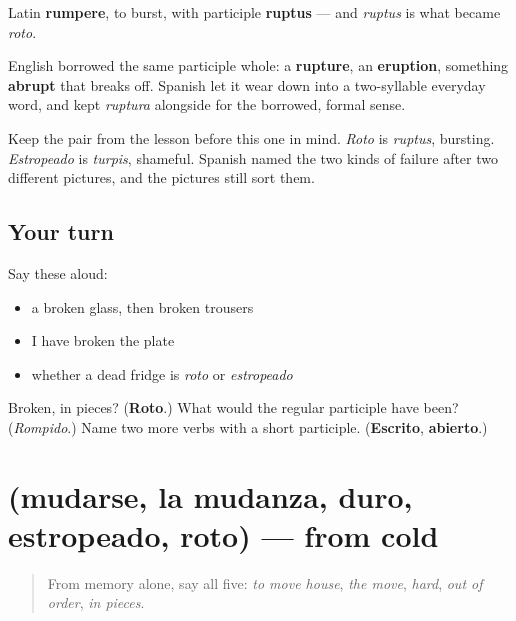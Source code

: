 \begin{cousinweb}
Latin \textbf{rumpere}, to burst, with participle \textbf{ruptus} — and \emph{ruptus} is what became \emph{roto}.

English borrowed the same participle whole: a \textbf{rupture}, an \textbf{eruption}, something \textbf{abrupt} that breaks off. Spanish let it wear down into a two-syllable everyday word, and kept \emph{ruptura} alongside for the borrowed, formal sense.

Keep the pair from the lesson before this one in mind. \emph{Roto} is \emph{ruptus}, bursting. \emph{Estropeado} is \emph{turpis}, shameful. Spanish named the two kinds of failure after two different pictures, and the pictures still sort them.
\end{cousinweb}

\subsection*{Your turn}
Say these aloud:

\begin{itemize}
\raggedright
  \item a broken glass, then broken trousers
  \item I have broken the plate
  \item whether a dead fridge is \emph{roto} or \emph{estropeado}
\end{itemize}

\begin{tcolorbox}[breakable,colback=teal!4,colframe=teal!35!black,title={Before you move on}]
Broken, in pieces? (\textbf{Roto}.) What would the regular participle have been? (\emph{Rompido}.) Name two more verbs with a short participle. (\textbf{Escrito}, \textbf{abierto}.)
\end{tcolorbox}
\section[(mudarse, la mudanza, duro …]{(mudarse, la mudanza, duro, estropeado, roto) — from cold}

\label{lesson:ES-R448-repaso-mudanza}



\begin{quote}
From memory alone, say all five: \emph{to move house}, \emph{the move}, \emph{hard}, \emph{out of order}, \emph{in pieces}.
\end{quote}

